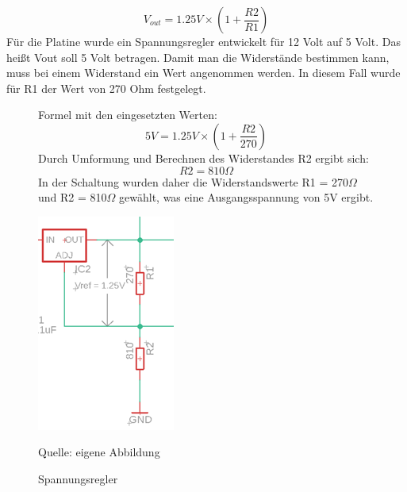 \documentclass[ngerman,12pt,a4paper]{article}
\begin{document}
		\begin{equation}
			V_{out} = 1.25V \times \left( 1 + \frac{R2}{R1} \right)
		\end{equation}
		Für die Platine wurde ein Spannungsregler entwickelt für 12 Volt auf 5 Volt. Das heißt Vout soll 5 Volt betragen. Damit man die Widerstände bestimmen kann, muss bei einem Widerstand ein Wert angenommen werden. In diesem Fall wurde für R1 der Wert von 270 Ohm festgelegt.
		\newpage
		\begin{figure}[htbp]
			\begin{minipage}[t]{6cm}
				\vspace{0pt}
				Formel mit den eingesetzten Werten:
				\begin{equation}
					5V = 1.25V \times \left( 1 + \frac{R2}{270} \right)
				\end{equation}	
				Durch Umformung und Berechnen des Widerstandes R2 ergibt sich:
				\begin{equation}
					R2 = 810 \Omega
				\end{equation}	
				In der Schaltung wurden daher die Widerstandswerte R1 = 270$\Omega$ und R2 = 810$\Omega$ gewählt, was eine Ausgangsspannung von 5V ergibt. 
			\end{minipage}
			\hfill
			\begin{minipage}[t]{6cm}
				\vspace{0pt}
				\centering
				\includegraphics{Pictures/spannungsregler}
				\caption{Spannungsregler}
				\label{fig: Spannungsregler}
				\vspace{-10pt}
				\begin{center}
					\par\small Quelle: eigene Abbildung
				\end{center}
			\end{minipage}
		\end{figure}
		
\end{document}
